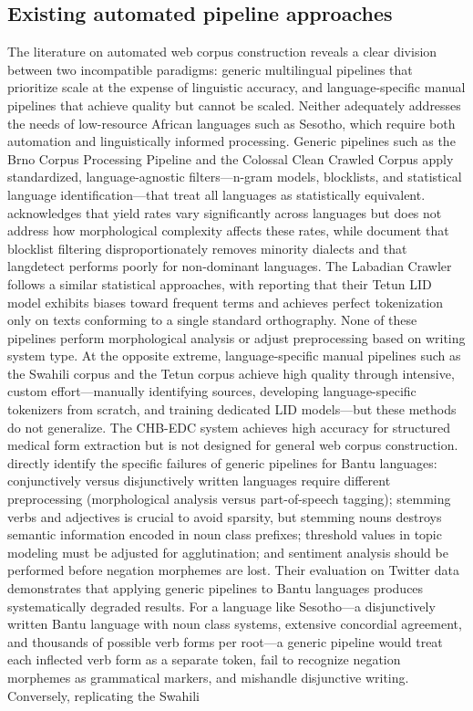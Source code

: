 \documentclass[12pt]{ThesisRU}
\begin{document}
\subsection{Existing automated pipeline approaches}
The literature on automated web corpus construction reveals a clear division between two incompatible paradigms: generic multilingual pipelines that prioritize scale at the expense of linguistic accuracy, and language-specific manual pipelines that achieve quality but cannot be scaled. Neither adequately addresses the needs of low-resource African languages such as Sesotho, which require both automation and linguistically informed processing. Generic pipelines such as the Brno Corpus Processing Pipeline \citet{suchomel2020better} and the Colossal Clean Crawled Corpus \citep{dodge2021documenting} apply standardized, language-agnostic filters—n-gram models, blocklists, and statistical language identification—that treat all languages as statistically equivalent. \citet{suchomel2020better} acknowledges that yield rates vary significantly across languages but does not address how morphological complexity affects these rates, while \citet{dodge2021documenting} document that blocklist filtering disproportionately removes minority dialects and that langdetect performs poorly for non-dominant languages. The Labadian Crawler \citet{de2024data} follows a similar statistical approaches, with \citet{de2024data} reporting that their Tetun LID model exhibits biases toward frequent terms and achieves perfect tokenization only on texts conforming to a single standard orthography. None of these pipelines perform morphological analysis or adjust preprocessing based on writing system type. At the opposite extreme, language-specific manual pipelines such as the Swahili corpus \citet{masua2024heart} and the Tetun corpus \citet{de2024data} achieve high quality through intensive, custom effort—manually identifying sources, developing language-specific tokenizers from scratch, and training dedicated LID models—but these methods do not generalize. The CHB-EDC system \citet{Zhou2024} achieves high accuracy for structured medical form extraction but is not designed for general web corpus construction. \citet{nchabeleng2020evaluating} directly identify the specific failures of generic pipelines for Bantu languages: conjunctively versus disjunctively written languages require different preprocessing (morphological analysis versus part-of-speech tagging); stemming verbs and adjectives is crucial to avoid sparsity, but stemming nouns destroys semantic information encoded in noun class prefixes; threshold values in topic modeling must be adjusted for agglutination; and sentiment analysis should be performed before negation morphemes are lost. Their evaluation on Twitter data demonstrates that applying generic pipelines to Bantu languages produces systematically degraded results. For a language like Sesotho—a disjunctively written Bantu language with noun class systems, extensive concordial agreement, and thousands of possible verb forms per root—a generic pipeline would treat each inflected verb form as a separate token, fail to recognize negation morphemes as grammatical markers, and mishandle disjunctive writing. Conversely, replicating the Swahili 
\end{document}
